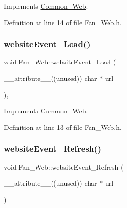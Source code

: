 Implements \hyperlink{class_common___web_a898e3fd8cc6384ecbbbd79c8a3a13b62}{Common\+\_\+\+Web}.



Definition at line 14 of file Fan\+\_\+\+Web.\+h.

\mbox{\label{class_fan___web_a3d75cb434fbc0b2885acf73b3a1576c9}} 
\subsubsection{\texorpdfstring{website\+Event\+\_\+\+Load()}{websiteEvent\_Load()}}
{\footnotesize\ttfamily void Fan\+\_\+\+Web\+::website\+Event\+\_\+\+Load (\begin{DoxyParamCaption}\item[{\+\_\+\+\_\+attribute\+\_\+\+\_\+((unused)) char $\ast$}]{url }\end{DoxyParamCaption})\hspace{0.3cm}{\ttfamily [inline]}, {\ttfamily [virtual]}}



Implements \hyperlink{class_common___web_a5ce0d5ce6f63279c3b624371d8a76211}{Common\+\_\+\+Web}.



Definition at line 13 of file Fan\+\_\+\+Web.\+h.

\mbox{\label{class_fan___web_a328af0b2469de198e88f0dd51758a5cb}} 
\subsubsection{\texorpdfstring{website\+Event\+\_\+\+Refresh()}{websiteEvent\_Refresh()}}
{\footnotesize\ttfamily void Fan\+\_\+\+Web\+::website\+Event\+\_\+\+Refresh (\begin{DoxyParamCaption}\item[{\+\_\+\+\_\+attribute\+\_\+\+\_\+((unused)) char $\ast$}]{url }\end{DoxyParamCaption})\hspace{0.3cm}{\ttfamily [virtual]}}




